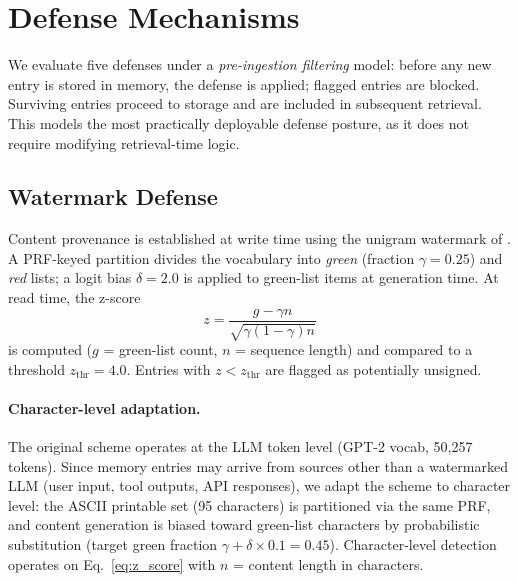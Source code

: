 \section{Defense Mechanisms}
\label{sec:defenses}

We evaluate five defenses under a \emph{pre-ingestion filtering} model:
before any new entry is stored in memory, the defense is applied; flagged
entries are blocked.  Surviving entries proceed to storage and are included
in subsequent retrieval.  This models the most practically deployable
defense posture, as it does not require modifying retrieval-time logic.

\subsection{Watermark Defense}
\label{sec:watermark_defense}

Content provenance is established at write time using the unigram watermark
of \citet{zhao2024watermark}.  A PRF-keyed partition divides the vocabulary
into \emph{green} (fraction $\gamma=0.25$) and \emph{red} lists; a logit
bias $\delta=2.0$ is applied to green-list items at generation time.
At read time, the z-score
\begin{equation}
  z = \frac{g - \gamma n}{\sqrt{\gamma(1-\gamma)n}}
  \label{eq:z_score}
\end{equation}
is computed ($g$ = green-list count, $n$ = sequence length) and compared to
a threshold $z_{\mathrm{thr}}=4.0$.  Entries with $z < z_{\mathrm{thr}}$ are
flagged as potentially unsigned.

\paragraph{Character-level adaptation.}
The original scheme operates at the LLM token level (GPT-2 vocab, 50{,}257
tokens).  Since memory entries may arrive from sources other than a
watermarked LLM (user input, tool outputs, API responses), we adapt the
scheme to character level: the ASCII printable set (95 characters) is
partitioned via the same PRF, and content generation is biased toward
green-list characters by probabilistic substitution (target green fraction
$\gamma + \delta \times 0.1 = 0.45$).  Character-level detection operates
on Eq.~\ref{eq:z_score} with $n$ = content length in characters.

